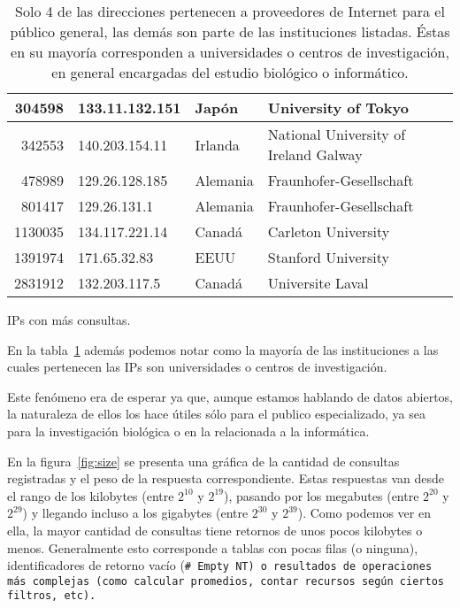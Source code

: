 \begin{table}[ht]
\begin{tabular}{|r|l|l|l|}
    304598  & 133.11.132.151  & Japón          
                   & University of Tokyo\\\hline
    342553  & 140.203.154.11  & Irlanda        
                   & National University of Ireland Galway\\\hline
    478989  & 129.26.128.185  & Alemania       
                   & Fraunhofer-Gesellschaft\\\hline
    801417  & 129.26.131.1    & Alemania       
                   & Fraunhofer-Gesellschaft\\\hline
    1130035 & 134.117.221.14  & Canadá         
                   & Carleton University\\\hline
    1391974 & 171.65.32.83    & EEUU 
                   & Stanford University\\\hline
    2831912 & 132.203.117.5   & Canadá         
                   & Universite Laval\\\hline
  \end{tabular}
  \caption{IPs con más consultas.}\label{tab:ips}
  \vspace{-.2cm}
  \caption*{\small
    Solo 4 de las direcciones pertenecen a proveedores de Internet para el
    público general, las demás son parte de las instituciones listadas.
    Éstas en su mayoría corresponden a universidades o centros de investigación,
    en general encargadas del estudio biológico o informático.
  }
\end{table}

En la tabla~\ref{tab:ips} además podemos notar como la mayoría de las
instituciones a las cuales pertenecen las IPs son universidades o centros de
investigación.

Este fenómeno era de esperar ya que, aunque estamos hablando de datos abiertos,
la naturaleza de ellos los hace útiles sólo para el publico especializado, ya
sea para la investigación biológica o en la relacionada a la informática.

En la figura~\ref{fig:size} se presenta una gráfica de la cantidad de consultas
registradas y el peso de la respuesta correspondiente. Estas respuestas van
desde el rango de los kilobytes (entre $2^{10}$ y $2^{19}$), pasando por los
megabutes (entre $2^{20}$ y $2^{29}$) y llegando incluso a los gigabytes (entre
$2^{30}$ y  $2^{39}$).
Como podemos ver en ella, la mayor cantidad de consultas tiene retornos de unos
pocos kilobytes o menos.
Generalmente esto corresponde a tablas con pocas filas (o ninguna),
identificadores de retorno vacío (\tt{\# Empty NT}) o resultados de operaciones
más complejas (como calcular promedios, contar recursos según ciertos filtros,
etc).

